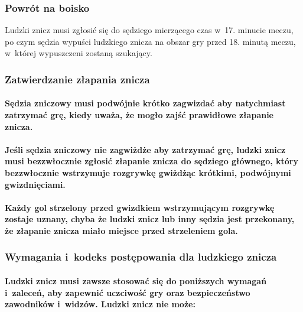 \documentclass[12pt]{article}
\begin{document}
\subsubsection{Powrót na boisko}

Ludzki znicz musi zgłosić się do sędziego mierzącego czas w~17. minucie
meczu, po czym sędzia wypuści ludzkiego znicza na obszar gry przed 18.
minutą meczu, w~której wypuszczeni zostaną szukający.

\subsubsection{Zatwierdzanie złapania znicza}

\paragraph{Sędzia zniczowy musi podwójnie krótko zagwizdać aby
	natychmiast zatrzymać grę, kiedy uważa, że mogło zajść prawidłowe
	złapanie znicza.}

\paragraph{Jeśli sędzia zniczowy nie zagwiżdże aby zatrzymać grę,
	ludzki znicz musi bezzwłocznie zgłosić złapanie znicza do sędziego
	głównego, który bezzwłocznie wstrzymuje rozgrywkę gwiżdżąc krótkimi,
	podwójnymi gwizdnięciami.}

\paragraph{Każdy gol strzelony przed gwizdkiem wstrzymującym
	rozgrywkę zostaje uznany, chyba że ludzki znicz lub inny sędzia jest
	przekonany, że złapanie znicza miało miejsce przed strzeleniem gola.}

\subsubsection{Wymagania i~kodeks postępowania dla ludzkiego znicza}

\paragraph{Ludzki znicz musi zawsze stosować się do poniższych
	wymagań i~zaleceń, aby zapewnić uczciwość gry oraz bezpieczeństwo
	zawodników i~widzów. Ludzki znicz nie może:}
\end{document}
